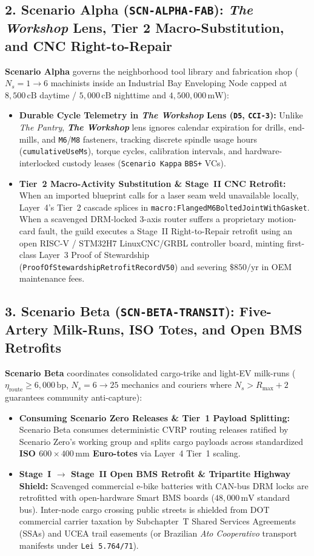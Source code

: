 \subsection{2. Scenario Alpha (\texttt{SCN-ALPHA-FAB}): \textit{The Workshop} Lens, Tier 2 Macro-Substitution, and CNC Right-to-Repair}
\textbf{Scenario Alpha} governs the neighborhood tool library and fabrication shop ($N_s = 1 \to 6$ machinists inside an Industrial Bay Enveloping Node capped at $8{,}500\,\mathrm{cB}$ daytime / $5{,}000\,\mathrm{cB}$ nighttime and $4{,}500{,}000\,\mathrm{mW}$):
\begin{itemize}
    \item \textbf{Durable Cycle Telemetry in \textit{The Workshop} Lens (\texttt{D5}, \texttt{CCI-3}):} Unlike \textit{The Pantry}, \textbf{\textit{The Workshop}} lens ignores calendar expiration for drills, end-mills, and \texttt{M6}/\texttt{M8} fasteners, tracking discrete spindle usage hours (\texttt{cumulativeUseMs}), torque cycles, calibration intervals, and hardware-interlocked custody leases (\texttt{Scenario Kappa} \texttt{BBS+} VCs).
    \item \textbf{Tier~2 Macro-Activity Substitution \& Stage~II CNC Retrofit:} When an imported blueprint calls for a laser seam weld unavailable locally, Layer~4's Tier~2 cascade splices in \texttt{macro:FlangedM6BoltedJointWithGasket}. When a scavenged DRM-locked 3-axis router suffers a proprietary motion-card fault, the guild executes a Stage~II Right-to-Repair retrofit using an open RISC-V / STM32H7 LinuxCNC/GRBL controller board, minting first-class Layer~3 Proof of Stewardship (\texttt{ProofOfStewardshipRetrofitRecordV50}) and severing $\$850/\mathrm{yr}$ in OEM maintenance fees.
\end{itemize}

\subsection{3. Scenario Beta (\texttt{SCN-BETA-TRANSIT}): Five-Artery Milk-Runs, ISO Totes, and Open BMS Retrofits}
\textbf{Scenario Beta} coordinates consolidated cargo-trike and light-EV milk-runs ($\eta_{\mathrm{route}} \ge 6{,}000\,\mathrm{bp}$, $N_s = 6 \to 25$ mechanics and couriers where $N_s > R_{\max} + 2$ guarantees community anti-capture):
\begin{itemize}
    \item \textbf{Consuming Scenario Zero Releases \& Tier~1 Payload Splitting:} Scenario Beta consumes deterministic CVRP routing releases ratified by Scenario Zero's working group and splits cargo payloads across standardized \textbf{ISO $600 \times 400\,\mathrm{mm}$ Euro-totes} via Layer~4 Tier~1 scaling.
    \item \textbf{Stage~I $\to$ Stage~II Open BMS Retrofit \& Tripartite Highway Shield:} Scavenged commercial e-bike batteries with CAN-bus DRM locks are retrofitted with open-hardware Smart BMS boards ($48{,}000\,\mathrm{mV}$ standard bus). Inter-node cargo crossing public streets is shielded from DOT commercial carrier taxation by Subchapter~T Shared Services Agreements (SSAs) and UCEA trail easements (or Brazilian \textit{Ato Cooperativo} transport manifests under \texttt{Lei 5.764/71}).
\end{itemize}


